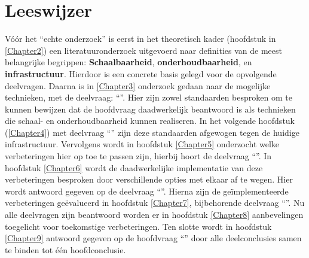 \section{Leeswijzer}

Vóór het \enquote{echte onderzoek} is eerst in het theoretisch kader (hoofdstuk in \ref{Chapter2}) een literatuuronderzoek uitgevoerd naar definities van de meest belangrijke begrippen: \textbf{Schaalbaarheid}, \textbf{onderhoudbaarheid}, en \textbf{infrastructuur}. Hierdoor is een concrete basis gelegd voor de opvolgende deelvragen. Daarna is in \ref{Chapter3} onderzoek gedaan naar de mogelijke technieken, met de deelvraag: \enquote{\deeltechnieken}. Hier zijn zowel standaarden besproken om te kunnen bewijzen dat de hoofdvraag daadwerkelijk beantwoord is als technieken die schaal- en onderhoudbaarheid kunnen realiseren. In het volgende hoofdstuk (\ref{Chapter4}) met deelvraag \enquote{\deelhuidig} zijn deze standaarden afgewogen tegen de huidige infrastructuur. Vervolgens wordt in hoofdstuk \ref{Chapter5} onderzocht welke verbeteringen hier op toe te passen zijn, hierbij hoort de deelvraag \enquote{\deelverbetering}. In hoofdstuk \ref{Chapter6} wordt de daadwerkelijke implementatie van deze verbeteringen besproken door verschillende opties met elkaar af te wegen. Hier wordt antwoord gegeven op de deelvraag \enquote{\deelverbetering}. Hierna zijn de geïmplementeerde verbeteringen geëvalueerd in hoofdstuk \ref{Chapter7}, bijbehorende deelvraag \enquote{\deelrequirements}. Nu alle deelvragen zijn beantwoord worden er in hoofdstuk \ref{Chapter8} aanbevelingen toegelicht voor toekomstige verbeteringen. Ten slotte wordt in hoofdstuk \ref{Chapter9} antwoord gegeven op de hoofdvraag \enquote{\hoofdvraagname} door alle deelconclusies samen te binden tot één hoofdconclusie.